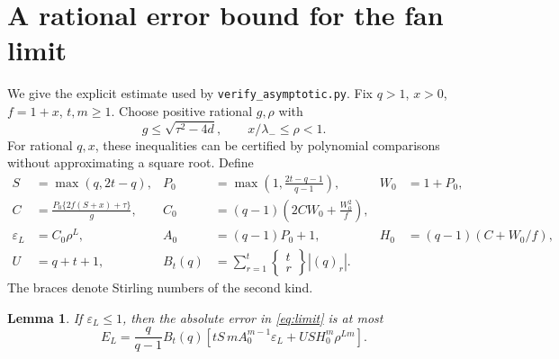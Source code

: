 \documentclass[11pt,a4paper]{article}
\newtheorem{lemma}[theorem]{Lemma}
\theoremstyle{remark}\newtheorem{remark}[theorem]{Remark}
\begin{document}
\appendix
\section{A rational error bound for the fan limit}\label{app:bound}
We give the explicit estimate used by \texttt{verify\_asymptotic.py}. Fix $q>1$, $x>0$, $f=1+x$, $t,m\ge1$. Choose positive rational $g,\rho$ with
\[
g\le\sqrt{\tau^2-4d},\qquad x/\lambda_-\le\rho<1.
\]
For rational $q,x$, these inequalities can be certified by polynomial comparisons without approximating a square root. Define
\begin{align*}
S&=\max(q,2t-q),&P_0&=\max\left(1,\frac{2t-q-1}{q-1}\right),&W_0&=1+P_0,\\
C&=\frac{P_0\{2f(S+x)+\tau\}}{g},&
C_0&=(q-1)\left(2CW_0+\frac{W_0^2}{f}\right),\\
\varepsilon_L&=C_0\rho^L,&A_0&=(q-1)P_0+1,&
H_0&=(q-1)(C+W_0/f),\\
U&=q+t+1,&B_t(q)&=\sum_{r=1}^t\left\{\!\begin{matrix}t\\r\end{matrix}\!\right\}|(q)_r|.
\end{align*}
The braces denote Stirling numbers of the second kind.
\begin{lemma}\label{lem:error}
If $\varepsilon_L\le1$, then the absolute error in \eqref{eq:limit} is at most
\begin{equation}\label{eq:error}
E_L=\frac q{q-1}B_t(q)
\left[tS\,mA_0^{m-1}\varepsilon_L
+US H_0^m\rho^{Lm}\right].
\end{equation}
\end{lemma}
\end{document}
